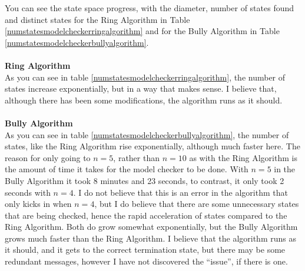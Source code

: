 \documentclass{report}
\begin{document}
You can see the state space progress, with the diameter, number of states found and distinct states for the Ring Algorithm in Table \ref{numstatesmodelcheckerringalgorithm} and for the Bully Algorithm in Table \ref{numstatesmodelcheckerbullyalgorithm}.
\\\\
\noindent
\textbf{Ring Algorithm}\\
\noindent
As you can see in table \ref{numstatesmodelcheckerringalgorithm}, the number of states increase exponentially, but in a way that makes sense. I believe that, although there has been some modifications, the algorithm runs as it should.
\\\\
\noindent
\textbf{Bully Algorithm}\\
\noindent
As you can see in table \ref{numstatesmodelcheckerbullyalgorithm}, the number of states, like the Ring Algorithm rise exponentially, although much faster here. The reason for only going to $n = 5$, rather than $n = 10$ as with the Ring Algorithm is the amount of time it takes for the model checker to be done. With $n = 5$ in the Bully Algorithm it took 8 minutes and 23 seconds, to contrast, it only took 2 seconds with $n = 4$. I do not believe that this is an error in the algorithm that only kicks in when $n = 4$, but I do believe that there are some unnecessary states that are being checked, hence the rapid acceleration of states compared to the Ring Algorithm. Both do grow somewhat exponentially, but the Bully Algorithm grows much faster than the Ring Algorithm. I believe that the algorithm runs as it should, and it gets to the correct termination state, but there may be some redundant messages, however I have not discovered the ``issue'', if there is one.
\end{document}
